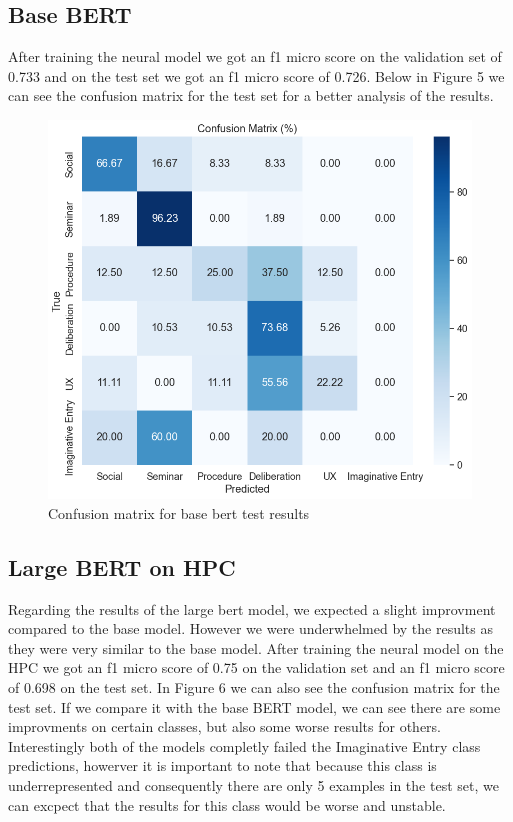\documentclass[fleqn,moreauthors,10pt]{ds_report}
\begin{document}
\subsection*{Base BERT}
After training the neural model we got an f1 micro score on the validation set of 0.733 and on the test set we got an f1 micro score of 0.726. Below in Figure 5 we can see the confusion matrix for the test set for a better analysis of the results. 

\begin{figure}[ht]\centering
	\includegraphics[width=\linewidth]{report/fig/image.png}
    \caption{Confusion matrix for base bert test results}
	\label{fig:column}
\end{figure}

\subsection*{Large BERT on HPC}
 Regarding the results of the large bert model, we expected a slight improvment compared to the base model. However we were underwhelmed by the results as they were very similar to the base model. After training the neural model on the HPC we got an f1 micro score of 0.75 on the validation set and an f1 micro score of 0.698 on the test set. In Figure 6 we can also see the confusion matrix for the test set. If we compare it with the base BERT model, we can see there are some improvments on certain classes, but also some worse results for others. Interestingly both of the models completly failed the Imaginative Entry class predictions, howerver it is important to note that because this class is underrepresented and consequently there are only 5 examples in the test set, we can excpect that the results for this class would be worse and unstable.
\end{document}
